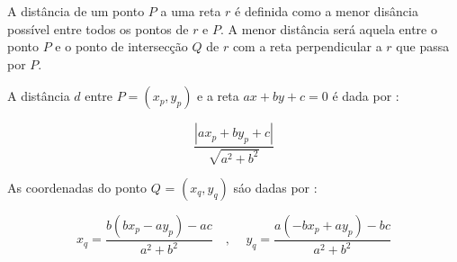 A distância de um ponto $P$ a uma reta $r$ é definida como a menor disância possível entre todos os pontos de $r$ e $P$. A menor distância será aquela entre o ponto $P$ e o ponto de intersecção $Q$ de $r$ com a reta perpendicular a $r$ que passa por $P$.

A distância $d$ entre $P = (x_p, y_p)$ e a reta $ax + by + c = 0$ é dada por :

\begin{equation}
    \frac{|a x_p + b y_p +c|}{\sqrt{a^2+b^2}}
\end{equation}

As coordenadas do ponto $Q$ = $(x_q, y_q)$ sáo dadas por : 

\begin{equation}
x_q = \frac{b (b x_p - a y_p)-ac}{a^2+b^2} \quad \text{, } \quad y_q = \frac{a(-bx_p+ay_p)-bc}{a^2+b^2}
\end{equation}

